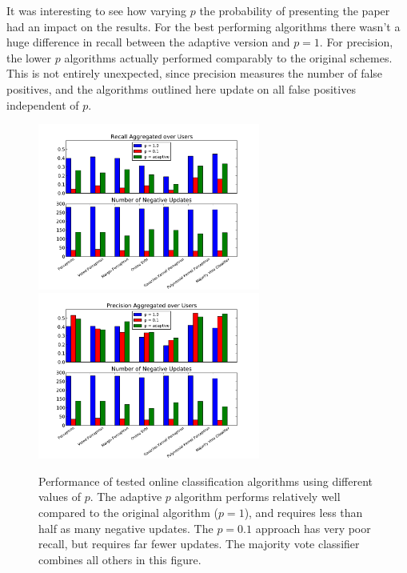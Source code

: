 \documentclass[12pt]{article}
\begin{document}
It was interesting to see how varying $p$ the probability of presenting the paper had an impact on the results.  For the best performing algorithms there wasn't a huge difference in recall between the adaptive version and $p = 1$.  For precision, the lower $p$ algorithms actually performed comparably to the original schemes.  This is not entirely unexpected, since precision measures the number of false positives, and the algorithms outlined here update on all false positives independent of $p$. \\

\begin{figure}[h!]\centering
\includegraphics[width=0.65\textwidth]{EveryoneRecallPaper.pdf}
\includegraphics[width=0.65\textwidth]{EveryonePrecisionPaper.pdf}
\label{fig:PrecisionandRecall}
\caption{ \small Performance of tested online classification algorithms using different values of $p$.  The adaptive $p$ algorithm performs relatively well compared to the original algorithm ($p = 1$), and requires less than half as many negative updates. The $p = 0.1$ approach has very poor recall, but requires far fewer updates.  The majority vote classifier combines all others in this figure.}
\end{figure}
\end{document}
